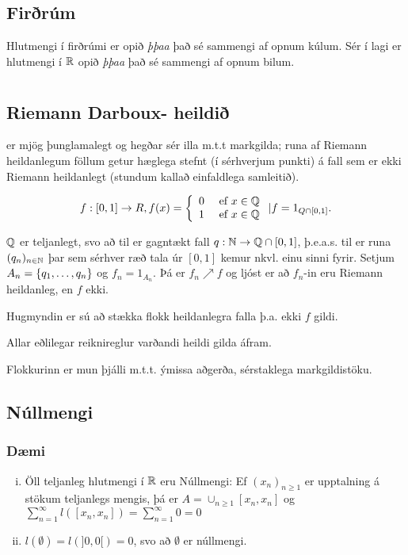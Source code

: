 \documentclass[12pt]{book}
\begin{document}
\section{Firðrúm} Hlutmengi í firðrúmi er opið \emph{þþaa} það sé sammengi af opnum kúlum. Sér í lagi er hlutmengi í $\mathbb{R}$ opið \emph{þþaa} það sé sammengi af opnum bilum.

\chapter{}
\section{Riemann Darboux- heildið} er mjög þunglamalegt og hegðar sér illa m.t.t markgilda; runa af Riemann heildanlegum föllum getur hæglega stefnt (í sérhverjum punkti) á fall sem er ekki Riemann heildanlegt (stundum kallað einfaldlega samleitið).

\begin{daemi}
\[f: [0,1] \to R, f(x) = \left\{ \begin{array}{l l} 0 & \text{ ef } x \in \mathbb{Q} \\ 1 & \text{ ef } x \in \mathbb{Q} \end{array} \right.  | f = 1_{Q \cap [0,1]}. \]

$\mathbb{Q}$ er teljanlegt, svo að til er gagntækt fall $q: \mathbb{N} \to \mathbb{Q} \cap [0,1]$, þ.e.a.s. til er runa $(q_n)_{n \in \mathbb{N}}$ þar sem sérhver ræð tala úr $[0,1]$ kemur nkvl. einu sinni fyrir. Setjum $A_n = \{q_1, \dotsc, q_n\}$ og $f_n = 1_{A_n}$. Þá er $f_n \nearrow f$ og ljóst er að $f_n$-in eru Riemann heildanleg, en $f$ ekki.

Hugmyndin er sú að stækka flokk heildanlegra falla þ.a. ekki $f$ gildi.

Allar eðlilegar reiknireglur varðandi heildi gilda áfram.

Flokkurinn er mun þjálli m.t.t. ýmissa aðgerða, sérstaklega markgildistöku.
\end{daemi}

\section{Núllmengi}
\subsection{Dæmi}
\begin{enumerate}[i)]
\item Öll teljanleg hlutmengi í $\mathbb{R}$ eru Núllmengi: Ef $(x_n)_{n \geq 1}$ er upptalning á stökum teljanlegs mengis, þá er $A = \cup_{n \geq 1} [x_n, x_n]$ og $\sum_{n = 1}^{\infty} l([x_n,x_n]) = \sum_{n=1}^{\infty} 0 = 0$
\item $l(\emptyset) = l(]0,0[) = 0$, svo að $\emptyset$ er núllmengi.
\end{enumerate}
\end{document}

